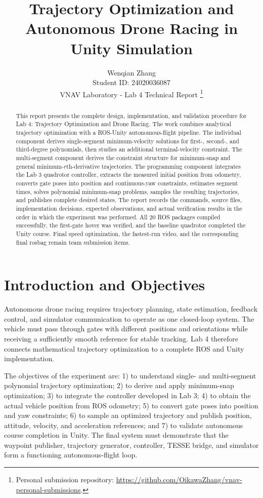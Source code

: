 \documentclass[letterpaper,10pt,conference]{IEEEtran}
\title{\LARGE \bf
Trajectory Optimization and Autonomous Drone Racing in Unity Simulation
}
\author{Wenqian Zhang\\
Student ID: 24020036087\\
VNAV Laboratory - Lab 4 Technical Report%
\thanks{Personal submission repository: \protect\url{https://github.com/OikawaZhang/vnav-personal-submissions}.}}
\begin{document}
\maketitle
\thispagestyle{empty}
\pagestyle{empty}

\begin{abstract}
This report presents the complete design, implementation, and validation procedure for Lab 4: Trajectory Optimization and Drone Racing. The work combines analytical trajectory optimization with a ROS-Unity autonomous-flight pipeline. The individual component derives single-segment minimum-velocity solutions for first-, second-, and third-degree polynomials, then studies an additional terminal-velocity constraint. The multi-segment component derives the constraint structure for minimum-snap and general minimum-$r$th-derivative trajectories. The programming component integrates the Lab 3 quadrotor controller, extracts the measured initial position from odometry, converts gate poses into position and continuous-yaw constraints, estimates segment times, solves polynomial minimum-snap problems, samples the resulting trajectories, and publishes complete desired states. The report records the commands, source files, implementation decisions, expected observations, and actual verification results in the order in which the experiment was performed. All 20 ROS packages compiled successfully, the first-gate hover was verified, and the baseline quadrotor completed the Unity course. Final speed optimization, the fastest-run video, and the corresponding final rosbag remain team submission items.
\end{abstract}

\section{Introduction and Objectives}
Autonomous drone racing requires trajectory planning, state estimation, feedback control, and simulator communication to operate as one closed-loop system. The vehicle must pass through gates with different positions and orientations while receiving a sufficiently smooth reference for stable tracking. Lab 4 therefore connects mathematical trajectory optimization to a complete ROS and Unity implementation.

The objectives of the experiment are: 1) to understand single- and multi-segment polynomial trajectory optimization; 2) to derive and apply minimum-snap optimization; 3) to integrate the controller developed in Lab 3; 4) to obtain the actual vehicle position from ROS odometry; 5) to convert gate poses into position and yaw constraints; 6) to sample an optimized trajectory and publish position, attitude, velocity, and acceleration references; and 7) to validate autonomous course completion in Unity. The final system must demonstrate that the waypoint publisher, trajectory generator, controller, TESSE bridge, and simulator form a functioning autonomous-flight loop.
\end{document}

